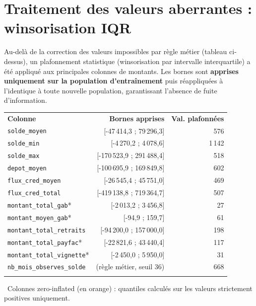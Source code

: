 \documentclass[11pt,a4paper]{report}
\let\oldtoprule\toprule
\renewcommand{\toprule}{\arrayrulecolor{corpslate}\oldtoprule\arrayrulecolor{black}}
\let\oldmidrule\midrule
\renewcommand{\midrule}{\arrayrulecolor{emsigreen}\oldmidrule\arrayrulecolor{black}}
\let\oldbottomrule\bottomrule
\renewcommand{\bottomrule}{\arrayrulecolor{corpslate}\oldbottomrule\arrayrulecolor{black}}
\begin{document}
\section{Traitement des valeurs aberrantes : winsorisation IQR}
\statutFait
Au-delà de la correction des valeurs impossibles par règle métier (tableau
ci-dessus), un plafonnement statistique (winsorisation par intervalle
interquartile) a été appliqué aux principales colonnes de montants. Les
bornes sont \textbf{apprises uniquement sur la population d'entraînement}
puis réappliquées à l'identique à toute nouvelle population, garantissant
l'absence de fuite d'information.

\begin{center}
\begin{tabular}{@{}lrr@{}}
\toprule
\rowcolor{corpslate!10}
\textbf{Colonne} & \textbf{Bornes apprises} & \textbf{Val. plafonnées} \\
\midrule
\texttt{solde\_moyen} & [-47\,414,3 ; 79\,296,3] & 576 \\
\texttt{solde\_min} & [-4\,270,2 ; 4\,078,6] & 1\,142 \\
\texttt{solde\_max} & [-170\,523,9 ; 291\,488,4] & 518 \\
\texttt{depot\_moyen} & [-100\,695,9 ; 169\,849,8] & 602 \\
\texttt{flux\_cred\_moyen} & [-26\,545,4 ; 45\,751,0] & 469 \\
\texttt{flux\_cred\_total} & [-419\,138,8 ; 719\,364,7] & 507 \\
\rowcolor{bcporange!8} \texttt{montant\_total\_gab}* & [-2\,013,2 ; 3\,456,8] & 27 \\
\rowcolor{bcporange!8} \texttt{montant\_moyen\_gab}* & [-94,9 ; 159,7] & 61 \\
\texttt{montant\_total\_retraits} & [-94\,200,0 ; 157\,000,0] & 198 \\
\rowcolor{bcporange!8} \texttt{montant\_total\_payfac}* & [-22\,821,6 ; 43\,440,4] & 117 \\
\rowcolor{bcporange!8} \texttt{montant\_total\_vignette}* & [-2\,450,0 ; 5\,950,0] & 31 \\
\texttt{nb\_mois\_observes\_solde} & (règle métier, seuil 36) & 668 \\
\bottomrule
\end{tabular}
\end{center}
\begin{center}
{\footnotesize * \colorbox{bcporange!8}{\phantom{x}}~Colonnes \og zero-inflated \fg{} (en orange) : quantiles calculés sur les valeurs strictement positives uniquement.}
\end{center}
\end{document}

